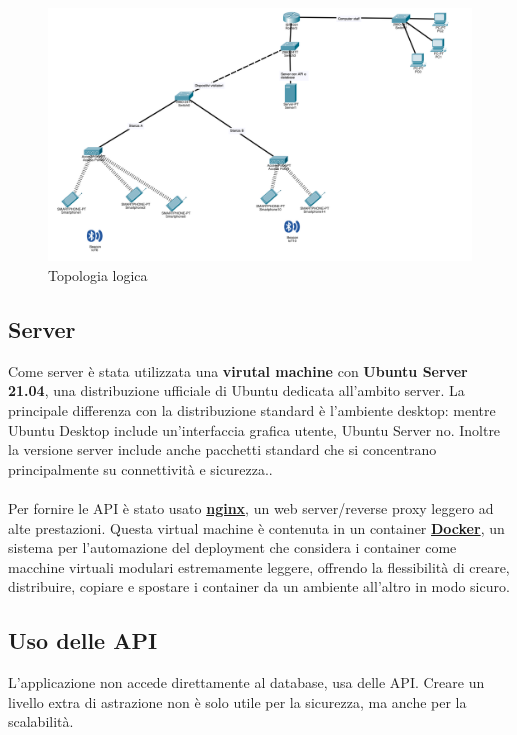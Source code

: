\documentclass[12pt]{article}
\begin{document}
\begin{center}
    \begin{figure}[htp]
        \centering
        \includegraphics[width=\textwidth]{diagrams/network_diagram_v3.png}
        \caption{Topologia logica}
        \label{fig:topologia_logica}
    \end{figure}
\end{center}

\subsection{Server}
Come server è stata utilizzata una \textbf{virutal machine} con \textbf{Ubuntu Server 21.04}, una distribuzione ufficiale di Ubuntu dedicata all'ambito server. La principale differenza con la distribuzione standard è l'ambiente desktop: mentre Ubuntu Desktop include un'interfaccia grafica utente, Ubuntu Server no. Inoltre la versione server include anche pacchetti standard che si concentrano principalmente su connettività e sicurezza.\cite{ubuntu_server_guide}.\\\\Per fornire le API è stato usato \textbf{\href{https://www.nginx.com/}{nginx}}, un web server/reverse proxy leggero ad alte prestazioni. Questa virtual machine è contenuta in un container \textbf{\href{https://www.docker.com/}{Docker}}, un sistema per l'automazione del deployment che considera i container come macchine virtuali modulari estremamente leggere, offrendo la flessibilità di creare, distribuire, copiare e spostare i container da un ambiente all'altro in modo sicuro.\cite{docker_guide}

\clearpage

\subsection{Uso delle API}
L'applicazione non accede direttamente al database, usa delle API. Creare un livello extra di astrazione non è solo utile per la sicurezza, ma anche per la scalabilità. 
\end{document}
